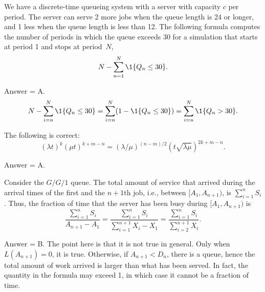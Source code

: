 \begin{exercise}[201804]
We have a discrete-time queueing system with a server with capacity $c$ per period. The server can serve 2 more jobs
when the queue length is 24 or longer, and 1 less when the queue length is less than 12. 
The following formula computes the number of periods in which the queue exceeds 30 for a simulation that starts at period 1 and stops at period~$N$, 
\begin{equation*}
N- \sum_{n=1}^N \1{Q_n \leq 30}.
\end{equation*}
\begin{solution}
Answer = A. 
\begin{equation*}
N- \sum_{i=n}^N \1{Q_n \leq 30} = 
\sum_{i=n}^N (1-\1{Q_n \leq 30}) = 
\sum_{i=n}^N \1{Q_n > 30}.
\end{equation*}
\end{solution}
\end{exercise}

\begin{exercise}[201804]
The following is correct: 
\begin{equation*}
 (\lambda t)^k (\mu t) ^{k + m - n} 
= (\lambda/\mu)^{(n-m)/2} (t\sqrt{\lambda \mu})^{2k+m-n}.
\end{equation*}
\begin{solution}
Answer = A.
\end{solution}
\end{exercise}

\begin{exercise}[201804] 
Consider the $G/G/1$ queue. The total amount of service that arrived during the arrival times of the first and the $n+1$th job, i.e., between $[A_1, A_{n+1})$, is $\sum_{i=1}^n S_i$.
Thus, the fraction of time that the server has been busy during $[A_1, A_{n+1})$ is
 \begin{equation*}
\frac{\sum_{i=1}^n S_i}{A_{n+1}-A_1} 
= \frac{\sum_{i=1}^n S_i}{\sum_{i=1}^{n+1}X_i -X_1} 
= \frac{\sum_{i=1}^n S_i}{\sum_{i=2}^{n+1}X_i}.
 \end{equation*}
\begin{solution}
Answer = B. The point here is that it is not true in general. Only when $L(A_{n+1})=0$, it is true. Otherwise, if $A_{n+1}< D_n$, there is a queue, hence the total amount of work arrived is larger than what has been served. In fact, the quantity in the formula may exceed 1, in which case it cannot be a fraction of time.
\end{solution}
\end{exercise}

